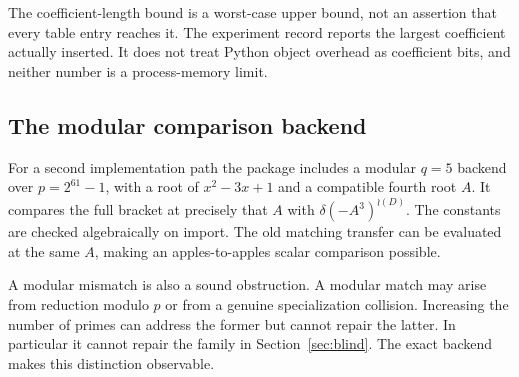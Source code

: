 The coefficient-length bound is a worst-case upper bound, not an assertion
that every table entry reaches it. The experiment record reports the
largest coefficient actually inserted. It does not treat Python object
overhead as coefficient bits, and neither number is a process-memory limit.

\subsection{The modular comparison backend}

For a second implementation path the package includes a modular $q=5$
backend over $p=2^{61}-1$, with a root of $x^2-3x+1$ and a compatible fourth
root $A$. It compares the full bracket at precisely that $A$ with
$\delta(-A^3)^{\wr(D)}$. The constants are checked algebraically on import.
The old matching transfer can be evaluated at the same $A$, making an
apples-to-apples scalar comparison possible.

A modular mismatch is also a sound obstruction. A modular match may arise
from reduction modulo $p$ or from a genuine specialization collision.
Increasing the number of primes can address the former but cannot repair
the latter. In particular it cannot repair the family in
Section~\ref{sec:blind}. The exact backend makes this distinction observable.
